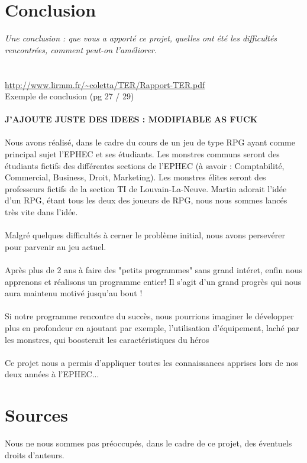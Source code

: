 \documentclass[a4paper,titlepage]{article}
\begin{document}
	\section{Conclusion}
	\textit{Une conclusion : que vous a apporté ce projet, quelles ont été les difficultés rencontrées, comment peut-on l’améliorer.}\\
	\\
	\\ \url{http://www.lirmm.fr/~coletta/TER/Rapport-TER.pdf} \\
	 Exemple de conclusion (pg 27 / 29)
	 \\
	 \\
	 \textbf{J'AJOUTE JUSTE DES IDEES : MODIFIABLE AS FUCK}\\
	\\
	Nous avons réalisé, dans le cadre du cours de  un jeu de type RPG ayant comme principal sujet l'EPHEC et ses étudiants. Les monstres communs seront des étudiants fictifs des différentes sections de l'EPHEC (à savoir : Comptabilité, Commercial, Business, Droit, Marketing). Les monstres élites seront des professeurs fictifs de la section TI de Louvain-La-Neuve.
	Martin adorait l'idée d'un RPG, étant tous les deux des joueurs de RPG, nous nous sommes lancés très vite dans l'idée.
	\\
	\\
	Malgré quelques difficultés à cerner le problème initial, nous avons persevérer pour parvenir au jeu actuel.
	\\
	\\
	Après plus de 2 ans à faire des "petits programmes" sans grand intéret, enfin nous apprenons et réalisons un programme entier! Il s'agit d'un grand progrès qui nous aura maintenu motivé jusqu'au bout !
	\\
	\\
	Si notre programme rencontre du succès, nous pourrions imaginer le développer plus en profondeur en ajoutant par exemple, l'utilisation d'équipement, laché par les monstres, qui boosterait les caractéristiques du héros
	\\
	\\
	Ce projet nous a permis d'appliquer toutes les connaissances apprises lors de nos deux années à l'EPHEC...
	
	\clearpage
	\section*{Sources }
\danger Nous ne nous sommes pas préoccupés, dans le cadre de ce projet, des éventuels droits d'auteurs.\\
\end{document}
